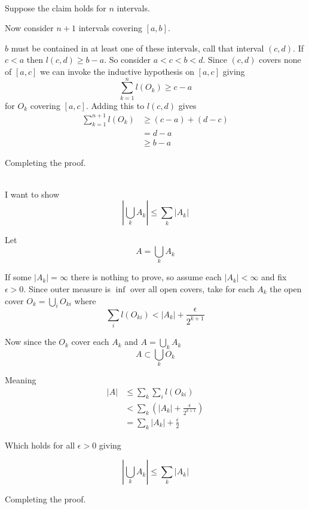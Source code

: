 \documentclass[12pt]{article}
\makeatletter
\theoremstyle{plain}
\theoremstyle{definition}
\theoremstyle{definition}
\theoremstyle{remark}
\renewenvironment{proof}[1][\proofname]{\par
\pushQED{\qed}\normalfont\topsep6\p@\@plus6\p@\relax
\trivlist\item[\hskip\labelsep\small\itshape #1\@addpunct{.}]\ignorespaces\mbox{}\\
}{\popQED\endtrivlist\@endpefalse}
\makeatother
\begin{document}
\begin{proof}[Proof: $\lvert [a, b{]}\rvert = b - a$]
    Suppose the claim holds for $n$ intervals.
    
    Now consider $n+1$ intervals covering $[a, b]$. 
    
    $b$ must be contained
    in at least one of these intervals, call that interval $(c, d)$. 
    If $c < a$ then $l(c, d) \geq b - a$.
    So consider $a < c < b < d$. Since $(c, d)$ covers none of $[a, c]$ we can invoke
    the inductive hypothesis on $[a, c]$ giving
    \begin{equation*}
        \sum_{k=1}^{n} l(O_k) \geq c - a
    \end{equation*} 
    for $O_k$ covering $[a, c]$. Adding this to $l(c, d)$ gives 
    \begin{align*}
        \sum_{k=1}^{n+1} l(O_k) &\geq (c - a) + (d - c) \\
        &= d - a \\
        &\geq b - a
    \end{align*}

    Completing the proof.
\end{proof}


\begin{proof}[Proof: Countable Subadditivity]
    I want to show 
    \begin{equation*}
        |\bigcup_k A_k| \leq \sum_k |A_k|
    \end{equation*}

    Let
    \begin{equation*}
        A = \bigcup_k A_k
    \end{equation*}

    If some $|A_k| = \infty$ there is nothing to prove, so assume each $|A_k| < \infty$
    and fix $\epsilon > 0$.
    Since outer measure is $\inf$ over all open covers, take for each $A_k$ the open cover
    $O_k = \bigcup_i O_{ki}$ where
    \begin{equation*}
        \sum_i l(O_{ki}) < |A_k| + \frac{\epsilon}{2^{k+1}}
    \end{equation*}

    Now since the $O_k$ cover each $A_k$ and $A = \bigcup_k A_k$
    \begin{equation*}
        A \subset \bigcup_k O_k
    \end{equation*}

    Meaning
    \begin{align*}
        |A| &\leq \sum_k \sum_i l(O_{ki}) \\
        &< \sum_k \left( |A_k| + \frac{\epsilon}{2^{k+1}} \right) \\
        &= \sum_k |A_k| + \frac{\epsilon}{2}
    \end{align*}

    Which holds for all $\epsilon > 0$ giving

    \begin{equation*}
        |\bigcup_k A_k| \leq \sum_k |A_k|
    \end{equation*}

    Completing the proof.

\end{proof}
\end{document}
